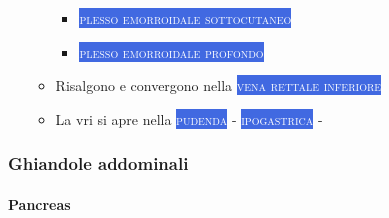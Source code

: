 \documentclass[italian,]{article}
\newcommand{\ven}[1]{\colorbox{RoyalBlue}{\textcolor{white}{\textsc{#1}}}}
\begin{document}
\begin{itemize}
\begin{itemize}
    \begin{itemize}
    \item
      \ven{plesso emorroidale sottocutaneo}
    \item
      \ven{plesso emorroidale profondo}
    \end{itemize}
  \item
    Risalgono e convergono nella \ven{vena rettale inferiore}
  \item
    La vri si apre nella \ven{pudenda} - \ven{ipogastrica} - \ven{\\}
  \end{itemize}
\end{itemize}

\hypertarget{ghiandole-addominali}{%
\subsubsection{Ghiandole addominali}\label{ghiandole-addominali}}

\hypertarget{pancreas}{%
\paragraph{Pancreas}\label{pancreas}}
\end{document}
